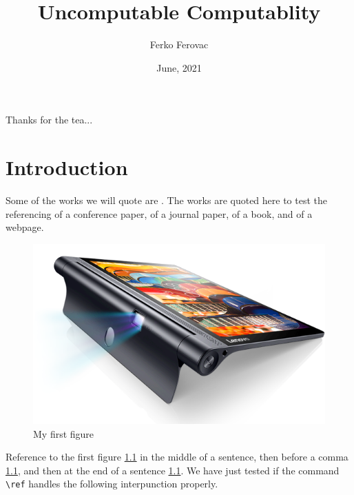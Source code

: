\documentclass[masterthesis]{fer}
\title{Uncomputable Computablity}
\author{Ferko Ferovac}
\date{June, 2021}
\begin{document}
\maketitle






\begin{zahvale}
  Thanks for the tea...
\end{zahvale}


\mainmatter


\tableofcontents


\chapter{Introduction}
\label{chp:introduction}

Some of the works we will quote are \cite{6248073,6247753,ghiglia_pritt_phase_unwrapping,hartley2003multiple,4250461,123DCatch}.
The works are quoted here to test the referencing of a conference paper, of a journal paper, of a book, and of a webpage.

\begin{figure}[htb]
  \centering
  \includegraphics[width=0.38\linewidth]{Figures/lenovo_yoga_tab3_pro_front.png} 
  \caption{My first figure}
  \label{fig:firstfigure}
\end{figure}

Reference to the first figure \ref{fig:firstfigure} in the middle of a sentence, then before a comma \ref{fig:firstfigure}, and then at the end of a sentence \ref{fig:firstfigure}.
We have just tested if the command \verb|\ref| handles the following interpunction properly.
\end{document}
